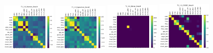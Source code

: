 \begin{figure}
    \centering
    \includegraphics[width=0.24\textwidth]{chap6/figs/T1_1.0_Pearson_Result.png}
    \includegraphics[width=0.24\textwidth]{chap6/figs/T1_1.0_Spearman_Result.png}
    \includegraphics[width=0.24\textwidth]{chap6/figs/T1_1.0_Glasso_Result.png}
    \includegraphics[width=0.24\textwidth]{chap6/figs/T1_1.0_CODEC_Result.png}
    

\end{figure}
